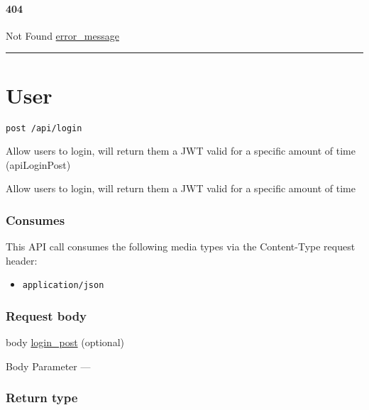 \hypertarget{section-478}{%
\paragraph{404}\label{section-478}}

Not Found \protect\hyperlink{error_message}{error\_message}

\begin{center}\rule{0.5\linewidth}{\linethickness}\end{center}

\hypertarget{user-1}{%
\section{\texorpdfstring{\protect\hypertarget{User}{}{User}}{User}}\label{user-1}}

\protect\hypertarget{apiLoginPost}{}{}

\begin{verbatim}
post /api/login
\end{verbatim}

Allow users to login, will return them a JWT valid for a specific amount
of time ({apiLoginPost})

Allow users to login, will return them a JWT valid for a specific amount
of time

\hypertarget{consumes-46}{%
\subsubsection{Consumes}\label{consumes-46}}

This API call consumes the following media types via the {Content-Type}
request header:

\begin{itemize}
\tightlist
\item
  \texttt{application/json}
\end{itemize}

\hypertarget{request-body-46}{%
\subsubsection{Request body}\label{request-body-46}}

body \protect\hyperlink{login_post}{login\_post} (optional)

{Body Parameter} ---

\hypertarget{return-type-113}{%
\subsubsection{Return type}\label{return-type-113}}

